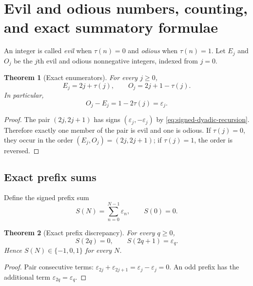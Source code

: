 \documentclass[11pt,oneside]{article}
\newtheorem{theorem}{Theorem}[section]
\theoremstyle{definition}
\theoremstyle{remark}
\newcommand{\eps}{\varepsilon}
\begin{document}
\section{Evil and odious numbers, counting, and exact summatory formulae}

An integer is called \emph{evil} when $\tau(n)=0$ and \emph{odious} when
$\tau(n)=1$.  Let $E_j$ and $O_j$ be the $j$th evil and odious nonnegative
integers, indexed from $j=0$.

\begin{theorem}[Exact enumerators]\label{thm:evil-odious-enumerators}
For every $j\ge0$,
\begin{equation}\label{eq:evil-odious-enumerators}
 \boxed{\quad E_j=2j+\tau(j),\qquad
 O_j=2j+1-\tau(j).\quad}
\end{equation}
In particular,
\begin{equation}\label{eq:evil-odious-gap}
 O_j-E_j=1-2\tau(j)=\eps_j.
\end{equation}
\end{theorem}

\begin{proof}
The pair $(2j,2j+1)$ has signs $(\eps_j,-\eps_j)$ by
\cref{eq:signed-dyadic-recursion}.  Therefore exactly one member of the pair is
evil and one is odious.  If $\tau(j)=0$, they occur in the order
$(E_j,O_j)=(2j,2j+1)$; if $\tau(j)=1$, the order is reversed.
\end{proof}

\subsection{Exact prefix sums}

Define the signed prefix sum
\begin{equation}\label{eq:prefix-sum-def}
 S(N)=\sum_{n=0}^{N-1}\eps_n,
 \qquad S(0)=0.
\end{equation}

\begin{theorem}[Exact prefix discrepancy]\label{thm:prefix-discrepancy}
For every $q\ge0$,
\begin{equation}\label{eq:prefix-discrepancy}
 S(2q)=0,
 \qquad
 S(2q+1)=\eps_q.
\end{equation}
Hence $S(N)\in\{-1,0,1\}$ for every $N$.
\end{theorem}

\begin{proof}
Pair consecutive terms:
$\eps_{2j}+\eps_{2j+1}=\eps_j-\eps_j=0$.  An odd prefix has the additional
term $\eps_{2q}=\eps_q$.
\end{proof}
\end{document}
